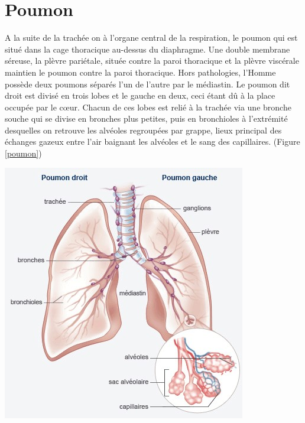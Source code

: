 \usepackage{SIunits}
\chapter{Poumon} %


\label{ch:01-02} %



A la suite de la trachée on à l’organe central de la respiration, le poumon qui est situé dans la cage thoracique au-dessus du diaphragme. Une double membrane séreuse, la plèvre pariétale, située contre la paroi thoracique et la plèvre viscérale maintien le poumon contre la paroi thoracique. Hors pathologies, l’Homme possède deux poumons séparés l’un de l’autre par le médiastin. Le poumon dit droit est divisé en trois lobes et le gauche en deux, ceci étant dû à la place occupée par le cœur. Chacun de ces lobes est relié à la trachée via une bronche souche qui se divise en bronches plus petites, puis en bronchioles à l’extrémité desquelles on retrouve les alvéoles regroupées par grappe, lieux principal des échanges gazeux entre l'air baignant les alvéoles et le sang des capillaires. (Figure \ref{poumon})

\begin{center}
\includegraphics[scale=0.7]{gfx/poumon.jpg} 
       \label{poumon}
\end{center}

